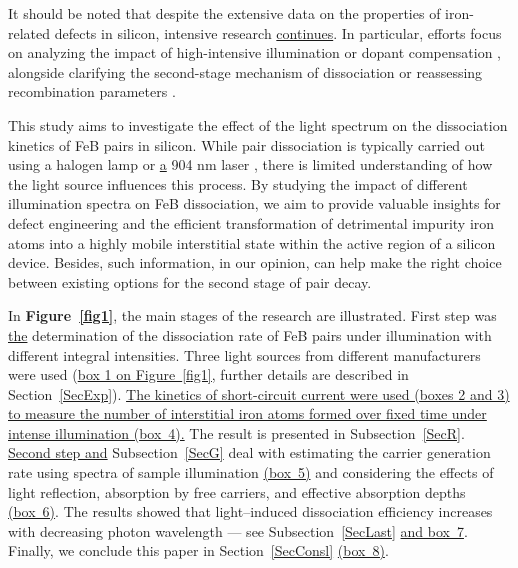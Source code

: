 \documentclass{WileyMSP-template}
\begin{document}
It should be noted that despite the extensive data on the properties of iron-related defects in silicon, intensive research \textcolor[rgb]{0.00,0.07,1.00}{\uline{continues}}.
In particular, efforts focus on analyzing the impact of high-intensive  illumination \cite{FeBStrongIll}
or dopant compensation \cite{Zhu2015},
alongside clarifying the second-stage mechanism of dissociation \cite{Sun2021}
or reassessing recombination parameters \cite{Le2024}.

This study aims to investigate the effect of the light spectrum on the dissociation kinetics of FeB pairs in silicon.
While pair dissociation is typically carried out using a halogen lamp \cite{FeBLight2,Sun2021}
or \textcolor[rgb]{0.00,0.07,1.00}{\uline{a}} 904 nm laser \cite{FeBStrongIll,FeBAssJAP2014,lauer2016}, there is limited understanding of how the light source influences this process.
By studying the impact of different illumination spectra on FeB dissociation,
we aim to provide valuable insights for defect engineering and the efficient transformation of detrimental impurity iron atoms into a highly mobile interstitial state
within the active region of a silicon device.
Besides, such information, in our opinion, can help make the right choice between existing options for the second stage of pair decay.

In \textbf{Figure~\ref{fig1}}, the main stages of the research are illustrated.
First step was \textcolor[rgb]{0.00,0.07,1.00}{\uline{the}} determination of the dissociation rate of FeB pairs under illumination with different integral intensities.
Three light sources from different manufacturers were used (\textcolor[rgb]{0.00,0.07,1.00}{\uline{box 1 on Figure~\ref{fig1}}}, further details are described in Section~\ref{SecExp}).
\textcolor[rgb]{0.00,0.07,1.00}{\uline{The kinetics of short-circuit current were used (boxes 2 and 3) to measure the number of interstitial iron atoms formed over fixed time under intense illumination (box~4).}}
The result is presented in Subsection~\ref{SecR}.
\textcolor[rgb]{0.00,0.07,1.00}{\uline{Second step and}} Subsection~\ref{SecG} deal with estimating the carrier generation rate using spectra of sample illumination
\textcolor[rgb]{0.00,0.07,1.00}{\uline{(box~5)}} and considering the effects of light reflection,
absorption by free carriers, and effective absorption depths \textcolor[rgb]{0.00,0.07,1.00}{\uline{(box~6)}}.
The results showed that light--induced dissociation efficiency increases with decreasing photon wavelength --- see Subsection~\ref{SecLast} \textcolor[rgb]{0.00,0.07,1.00}{\uline{and box~7}}.
Finally, we conclude this paper in Section~\ref{SecConsl} \textcolor[rgb]{0.00,0.07,1.00}{\uline{(box~8)}}.
\end{document}
